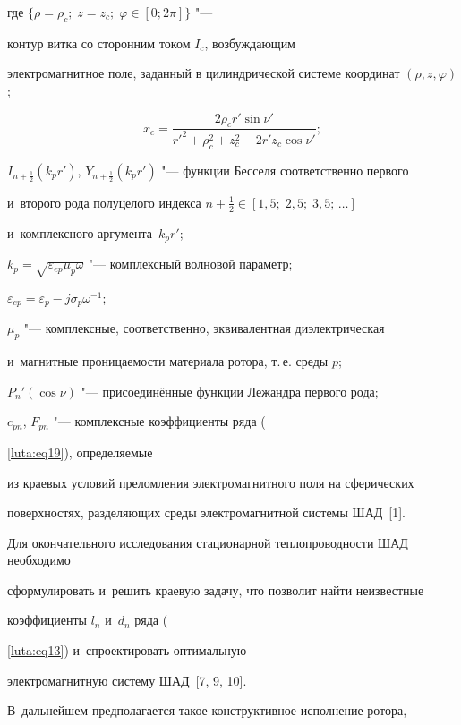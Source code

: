 {{{{{{{{{\begin{equation}
\end{equation}

где $\bigl\{ \rho =\rho_c;\; z=z_c;\; \varphi \in [0; 2\pi] \bigr\}$ "---

контур витка со сторонним током $I_c$, возбуждающим

электромагнитное поле, заданный в цилиндрической системе координат $(\rho, z, \varphi)$;

\begin{equation}

\label{luta:eq21}

x_c =\frac{2\rho _c r'\sin \nu '}{r'^2+\rho _c^2 +z_c^2 -2r'z_c \cos \nu '};

\end{equation}

$I_{n+\frac12} (k_p r')$, $Y_{n+\frac12} (k_p r')$ "--- функции Бесселя соответственно первого

и~второго рода полуцелого индекса $n+\frac12 \in  [1{,}5;\; 2{,}5;\; 3{,}5;\, \dots]$

и~комплексного аргумента~$k_{p}r'$;

$k_p =\sqrt {\varepsilon_{ep} \mu _p \omega } $ "--- комплексный волновой параметр;

\mbox{$\varepsilon _{ep} =\varepsilon_p -j\sigma_p \omega^{-1}$};

$\mu _p $ "--- комплексные, соответственно, эквивалентная диэлектрическая

и~магнитные проницаемости материала ротора, т.\,е. среды $p$;

$P_n' (\cos \nu )$ "--- присоединённые функции Лежандра первого рода;

$c_{pn}$, $F_{pn}$ "--- комплексные коэффициенты ряда ({\ref{luta:eq19}), определяемые

из краевых условий преломления электромагнитного поля на сферических

поверхностях, разделяющих среды электромагнитной системы ШАД~[1].



Для окончательного исследования стационарной теплопроводности ШАД необходимо

сформулировать и~решить краевую задачу, что позволит найти неизвестные

коэффициенты $l_{n}$ и~$d_{n}$ ряда ({\ref{luta:eq13}) и~спроектировать оптимальную

электромагнитную систему ШАД~[7, 9, 10].

В~дальнейшем предполагается такое конструктивное исполнение ротора,

}}}}}}}}}}}
